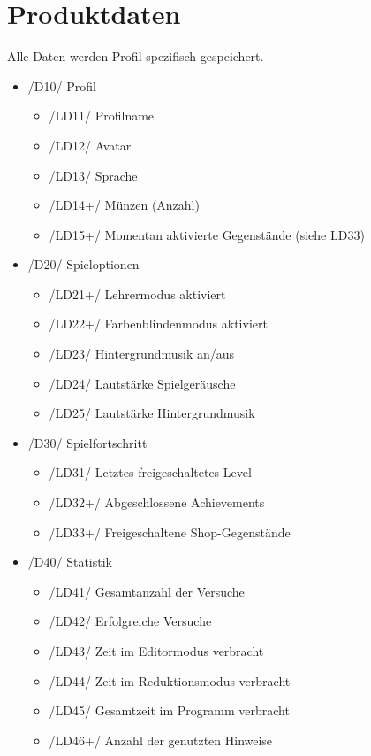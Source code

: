 \section{Produktdaten}

Alle Daten werden Profil-spezifisch gespeichert.

\begin{itemize}

\item /D10/ Profil
\begin{itemize}
\item /LD11/ Profilname
\item /LD12/ Avatar
\item /LD13/ Sprache
\item /LD14+/ Münzen (Anzahl)
\item /LD15+/ Momentan aktivierte Gegenstände (siehe LD33)
\end{itemize}

\item /D20/ Spieloptionen
\begin{itemize}
\item /LD21+/ Lehrermodus aktiviert
\item /LD22+/ Farbenblindenmodus aktiviert
\item /LD23/ Hintergrundmusik an/aus
\item /LD24/ Lautstärke Spielgeräusche
\item /LD25/ Lautstärke Hintergrundmusik
\end{itemize}

\item /D30/ Spielfortschritt
\begin{itemize}
\item /LD31/ Letztes freigeschaltetes Level
\item /LD32+/ Abgeschlossene Achievements
\item /LD33+/ Freigeschaltene Shop-Gegenstände
\end{itemize}

\item /D40/ Statistik
\begin{itemize}
\item /LD41/ Gesamtanzahl der Versuche
\item /LD42/ Erfolgreiche Versuche
\item /LD43/ Zeit im Editormodus verbracht
\item /LD44/ Zeit im Reduktionsmodus verbracht
\item /LD45/ Gesamtzeit im Programm verbracht
\item /LD46+/ Anzahl der genutzten Hinweise
\end{itemize}

\end{itemize}
